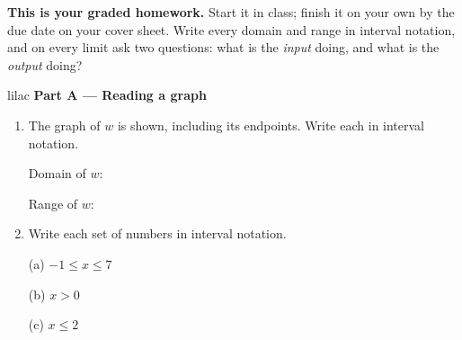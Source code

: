 \documentclass[10pt]{article}
\begin{document}

\vspace{0.12in}

\boxguard[8]
\begin{remindbox}
\small
\textbf{This is your graded homework.} Start it in class; finish it on your own by the due
date on your cover sheet. Write every domain and range in interval notation, and on every
limit ask two questions: what is the \emph{input} doing, and what is the \emph{output} doing?
\end{remindbox}

\vspace{0.12in}

\begin{headlinebox}{lilac}
\textbf{\color{plum}Part A --- Reading a graph}
\end{headlinebox}

\begin{minipage}[t]{0.44\linewidth}
\vspace{0pt}
\centering
{}
\end{minipage}\hfill
\begin{minipage}[t]{0.53\linewidth}
\vspace{0pt}
\begin{enumerate}[leftmargin=1.9em, itemsep=10pt]
\item The graph of $w$ is shown, including its endpoints. Write each in interval notation.

      Domain of $w$: \blank{2.6cm}

      Range of $w$: \blank{2.6cm}

\item Write each set of numbers in interval notation.

      (a) $-1 \le x \le 7$ \quad \blank{2.2cm}

      (b) $x > 0$ \quad \blank{2.2cm}

      (c) $x \le 2$ \quad \blank{2.2cm}
\end{enumerate}
\end{minipage}
\end{document}
